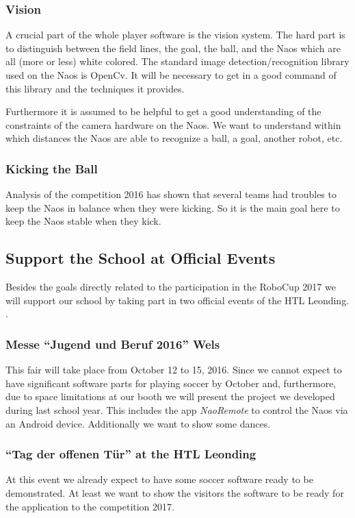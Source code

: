 \documentclass[12pt]{article}
\theoremstyle{definition}
\begin{document}
\subsubsection{Vision}
A crucial part of the whole player software is the vision system. The hard part is to distinguish between the field lines, the goal, the ball, and the Naos which are all (more or less) white colored. The standard image detection/recognition library used on the Naos is OpenCv. It will be necessary to get in a good command of this library and the techniques it provides.

Furthermore it is assumed to be helpful to get a good understanding of the constraints of the camera hardware on the Naos. We want to understand within which distances the Naos are able to recognize a ball, a goal, another robot, etc.

\subsubsection{Kicking the Ball}
Analysis of the competition 2016 has shown that several teams had troubles to keep the Naos in balance when they were kicking. So it is the main goal here to keep the Naos stable when they kick. 

\subsection{Support the School at Official Events}
Besides the goals directly related to the participation in the RoboCup 2017 we will support our school by taking part in two official events of the HTL Leonding. .
\subsubsection{Messe ``Jugend und Beruf 2016'' Wels}
This fair will take place from October 12 to 15, 2016. Since we cannot expect to have significant software parts for playing soccer by October and, furthermore, due to space limitations at our booth we will present the project we developed during last school year. This includes the app {\em NaoRemote} to control the Naos via an Android device. Additionally we want to show some dances.

\subsubsection{``Tag der offenen Tür'' at the HTL Leonding}
At this event we already expect to have some soccer software ready to be demonstrated. At least we want to show the visitors the software to be ready for the application to the competition 2017. 
\end{document}
